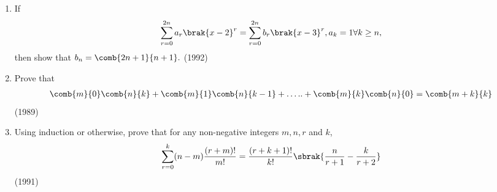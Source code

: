 \begin{enumerate}[label=\thesubsection.\arabic*,ref=\thesubsection.\theenumi]
 \item If $$ \sum\limits_{r=0}^{2n} a_r \brak{x-2}^r=\sum\limits_{r=0}^{2n}b_r \brak{x-3}^r,  a_k =1  \forall k \geq  n,$$ then show that $ b_n = \comb{2n+1}{n+1}.$ \hfill{(1992)}

 \item Prove that
		    \begin{align*} \comb{m}{0}\comb{n}{k} +\comb{m}{1}\comb{n}{k-1}+\dots..+\comb{m}{k}\comb{n}{0} =\comb{m+k}{k} \end{align*}  \hfill{(1989)}
 \item Using induction or otherwise, prove that for any non-negative integers $m,n,r$ and $ k$,
		    \begin{align*} 
			    \sum_{r=0}^{k}(n-m)\frac{(r+m)!}{m!}= \frac{(r+k+1)!}{k!}\sbrak{\frac{n}{r+1}-\frac{k}{r+2}}
		    \end{align*}
		     \hfill{(1991)} 
\end{enumerate}

